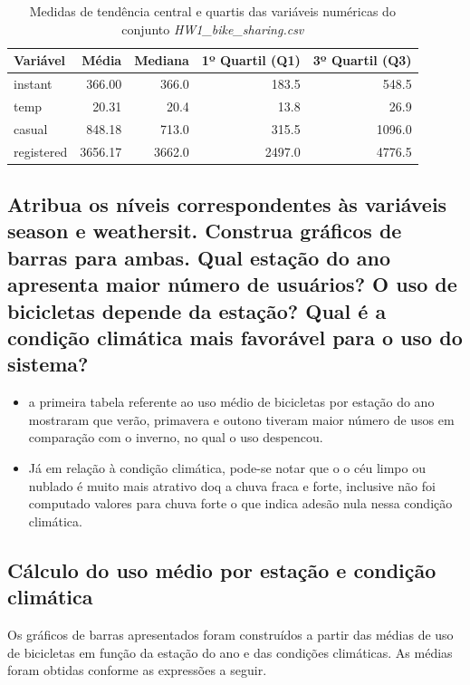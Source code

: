 \documentclass[12pt,a4paper]{article}
\begin{document}
\begin{table}[H]
\centering
\caption{Medidas de tendência central e quartis das variáveis numéricas do conjunto \textit{HW1\_bike\_sharing.csv}}
\label{tab:tendencia2}
\begin{tabular}{lrrrr}
\toprule
\textbf{Variável} & \textbf{Média} & \textbf{Mediana} & \textbf{1º Quartil (Q1)} & \textbf{3º Quartil (Q3)} \\ 
\midrule
instant    & 366.00  & 366.0  & 183.5  & 548.5  \\ 
temp       & 20.31   & 20.4   & 13.8   & 26.9   \\ 
casual     & 848.18  & 713.0  & 315.5  & 1096.0 \\ 
registered & 3656.17 & 3662.0 & 2497.0 & 4776.5 \\ 
\bottomrule
\end{tabular}
\end{table}

\subsection{Atribua os níveis correspondentes às variáveis season e weathersit. Construa gráficos
 de barras para ambas. Qual estação do ano apresenta maior número de usuários? O
 uso de bicicletas depende da estação? Qual é a condição climática mais favorável
 para o uso do sistema? }
 \begin{itemize}
    \item a primeira tabela referente ao uso médio de bicicletas por estação do ano mostraram que  verão, primavera e outono tiveram maior número de usos em comparação com o inverno, no qual o uso despencou.
    \item Já em relação à condição climática, pode-se notar que o o céu limpo ou nublado é muito mais atrativo doq a chuva fraca e forte, inclusive não foi computado valores para chuva forte o que indica adesão nula nessa condição climática.

\end{itemize}

\subsection*{Cálculo do uso médio por estação e condição climática}

Os gráficos de barras apresentados foram construídos a partir das médias de uso de bicicletas
em função da estação do ano e das condições climáticas. As médias foram obtidas conforme as expressões a seguir.
\end{document}
